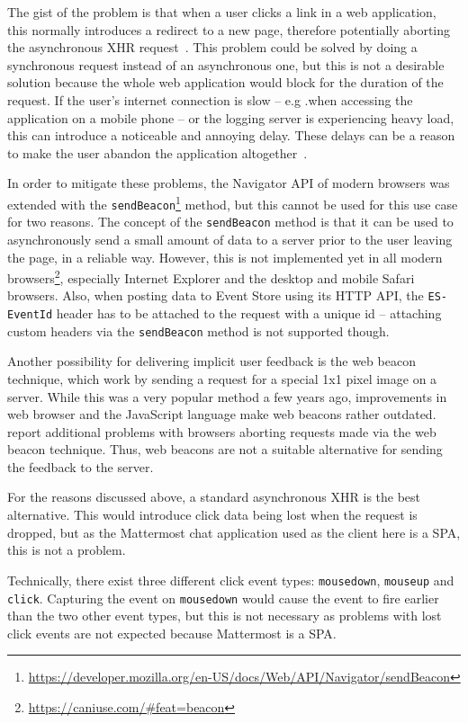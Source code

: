 The gist of the problem is that when a user clicks a link in a web application, this normally introduces a redirect to a new page, therefore potentially aborting the asynchronous \ac{XHR} request~\cite{Kohavi2010}.
This problem could be solved by doing a synchronous request instead of an asynchronous one, but this is not a desirable solution because the whole web application would block for the duration of the request.
If the user's internet connection is slow -- e.g .when accessing the application on a mobile phone -- or the logging server is experiencing heavy load, this can introduce a noticeable and annoying delay.
These delays can be a reason to make the user abandon the application altogether~\cite{Kohavi2010,Dmitriev2017}.

In order to mitigate these problems, the Navigator \ac{API} of modern browsers was extended with the \texttt{sendBeacon}\footnote{\url{https://developer.mozilla.org/en-US/docs/Web/API/Navigator/sendBeacon}} method, but this cannot be used for this use case for two reasons.
The concept of the \texttt{sendBeacon} method is that it can be used to asynchronously send a small amount of data to a server prior to the user leaving the page, in a reliable way.
However, this is not implemented yet in all modern browsers\footnote{\url{https://caniuse.com/\#feat=beacon}}, especially Internet Explorer and the desktop and mobile Safari browsers.
Also, when posting data to Event Store using its \ac{HTTP} \ac{API}, the \texttt{ES-EventId} header has to be attached to the request with a unique id -- attaching custom headers via the \texttt{sendBeacon} method is not supported though.

Another possibility for delivering implicit user feedback is the web beacon technique, which work by sending a request for a special 1x1 pixel image on a server.
While this was a very popular method a few years ago, improvements in web browser and the JavaScript language make web beacons rather outdated.
\citet{Kohavi2012} report additional problems with browsers aborting requests made via the web beacon technique.
Thus, web beacons are not a suitable alternative for sending the feedback to the server.

For the reasons discussed above, a standard asynchronous \ac{XHR} is the best alternative.
This would introduce click data being lost when the request is dropped, but as the Mattermost chat application used as the client here is a \ac{SPA}, this is not a problem.

Technically, there exist three different click event types: \texttt{mousedown}, \texttt{mouseup} and \texttt{click}.
Capturing the event on \texttt{mousedown} would cause the event to fire earlier than the two other event types, but this is not necessary as problems with lost click events are not expected because Mattermost is a \ac{SPA}.

